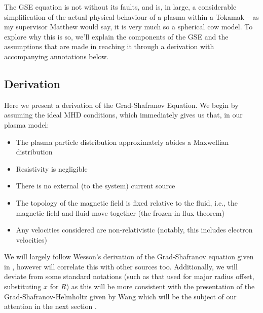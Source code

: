 The GSE equation is not without its faults, and is, in large, a considerable simplification of the actual physical behaviour 
of a plasma within a Tokamak -- as my supervisor Matthew would say, it is very much so a spherical cow model. To explore 
why this is so, we'll explain the components of the GSE and the assumptions that are made in reaching it through a 
derivation with accompanying annotations below.

\subsection{Derivation}

Here we present a derivation of the Grad-Shafranov Equation. We begin by assuming the ideal MHD conditions, which 
immediately gives us that, in our plasma model:
\begin{itemize}
    \item The plasma particle distribution approximately abides a Maxwellian distribution
    \item Resistivity is negligible
    \item There is no external (to the system) current source
    \item The topology of the magnetic field is fixed relative to the fluid, i.e., the magnetic field and fluid move together (the frozen-in flux theorem)
    \item Any velocities considered are non-relativistic (notably, this includes electron velocities)
\end{itemize}

\begin{remark}
    We will largely follow Wesson's derivation of the Grad-Shafranov equation given in \cite{wesson-tokamaks}, however 
    will correlate this with other sources too. Additionally, we will deviate from some standard notations (such as 
    that used for major radius offset, substituting $x$ for $R$) as this will be more consistent with the presentation 
    of the Grad-Shafranov-Helmholtz given by Wang which will be the subject of our 
    attention in the next section \cite{wang-analytic-solution}.
\end{remark}

